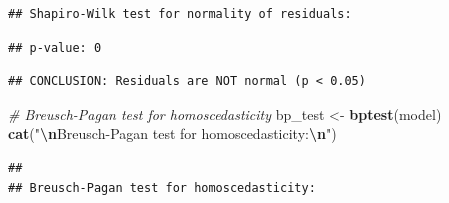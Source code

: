 \documentclass[
]{article}
\newenvironment{Shaded}{\begin{snugshade}}{\end{snugshade}}
\newcommand{\CommentTok}[1]{\textcolor[rgb]{0.56,0.35,0.01}{\textit{#1}}}
\newcommand{\ControlFlowTok}[1]{\textcolor[rgb]{0.13,0.29,0.53}{\textbf{#1}}}
\newcommand{\DecValTok}[1]{\textcolor[rgb]{0.00,0.00,0.81}{#1}}
\newcommand{\FloatTok}[1]{\textcolor[rgb]{0.00,0.00,0.81}{#1}}
\newcommand{\FunctionTok}[1]{\textcolor[rgb]{0.13,0.29,0.53}{\textbf{#1}}}
\newcommand{\NormalTok}[1]{#1}
\newcommand{\OtherTok}[1]{\textcolor[rgb]{0.56,0.35,0.01}{#1}}
\newcommand{\SpecialCharTok}[1]{\textcolor[rgb]{0.81,0.36,0.00}{\textbf{#1}}}
\newcommand{\StringTok}[1]{\textcolor[rgb]{0.31,0.60,0.02}{#1}}
\begin{document}
\begin{verbatim}
## Shapiro-Wilk test for normality of residuals:
\end{verbatim}

\begin{Shaded}
\end{Shaded}

\begin{verbatim}
## p-value: 0
\end{verbatim}

\begin{Shaded}
\end{Shaded}

\begin{verbatim}
## CONCLUSION: Residuals are NOT normal (p < 0.05)
\end{verbatim}

\begin{Shaded}
\begin{Highlighting}[]
\CommentTok{\# Breusch{-}Pagan test for homoscedasticity}
\NormalTok{bp\_test }\OtherTok{\textless{}{-}} \FunctionTok{bptest}\NormalTok{(model)}
\FunctionTok{cat}\NormalTok{(}\StringTok{"}\SpecialCharTok{\textbackslash{}n}\StringTok{Breusch{-}Pagan test for homoscedasticity:}\SpecialCharTok{\textbackslash{}n}\StringTok{"}\NormalTok{)}
\end{Highlighting}
\end{Shaded}

\begin{verbatim}
## 
## Breusch-Pagan test for homoscedasticity:
\end{verbatim}
\end{document}
